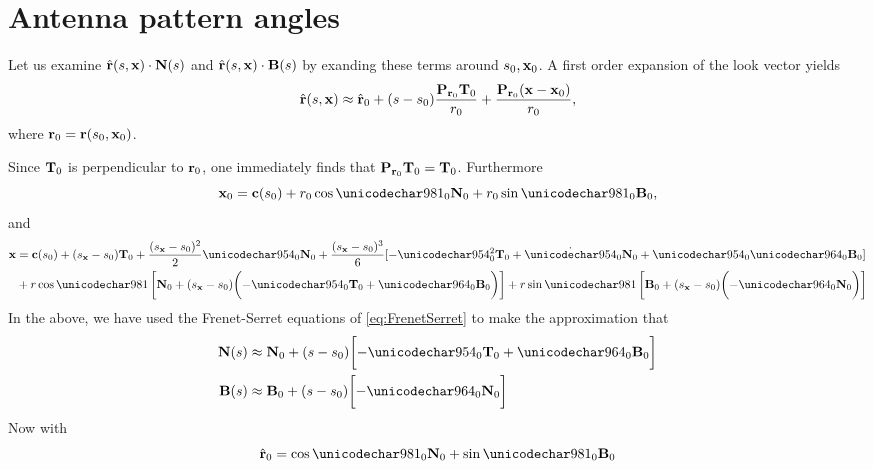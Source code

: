 \section{Antenna pattern angles}
\label{an:Angles}
Let us examine $\hat{\mathbf{r}}(s, \mathbf{\mathbf{x}})\cdot\mathbf{N}(s)$ and $\hat{\mathbf{r}}(s, \mathbf{\mathbf{x}})\cdot\mathbf{B}(s)$ by exanding these terms around $s_0, \mathbf{x}_0$. A first order expansion of the look vector yields
\begin{equation}
 \uRangeVectorParm \approx \uRangeVectorParmZero + (\parm-\parm_0)\frac{\mtx{P}_{\rangeVectorParmZero}\vct{T}_0}{\targetrangez} + \frac{\mtx{P}_{\rangeVectorParmZero}(\targetnoparm-\targetnoparmzero)}{\targetrangez},
\end{equation}
where $\mathbf{r}_0=\mathbf{r}(s_0, \mathbf{\mathbf{x}}_0)$.
\par
Since $\mathbf{T}_0$ is perpendicular to $\mathbf{r}_0$, one immediately finds that $\mtx{P}_{\rangeVectorParmZero}\vct{T}_0 = \vct{T}_0$. Furthermore
\begin{equation}
 \targetnoparmzero = \sat(\parm_0) + \targetrangez\cos\targetdepressionz\vct{N}_0 + \targetrangez\sin\targetdepressionz\vct{B}_0,
 \label{eq:pzero}
\end{equation}
and
\begin{equation}
\begin{split}
 \targetnoparm &= \sat(\parm_0) + (\targetxparm - \parm_0)\vct{T}_0 + \frac{(\targetxparm - \parm_0)^2}{2}\kappa_0\vct{N}_0 + \frac{(\targetxparm - \parm_0)^3}{6}[-\kappa^2_0\vct{T}_0 + \dot{\kappa}_0\vct{N}_0 + \kappa_0\tau_0\vct{B}_0]\\ 
 &+ \targetrange\cos\targetdepression\left[\vct{N}_0 + (\targetxparm - \parm_0)\biggl(-\kappa_0\vct{T}_0 + \tau_0\vct{B}_0\biggr)\right] + \targetrange\sin\targetdepression\left[\vct{B}_0 + (\targetxparm - \parm_0)\biggl(- \tau_0\vct{N}_0\biggr)\right]
 \label{eq:ptarget}
 \end{split}
\end{equation}
In the above, we have used the Frenet-Serret equations of \eqref{eq:FrenetSerret} to make the approximation that
\begin{align}
 \mtx{N}(\parm)&\approx\vct{N}_0 + (\parm - \parm_0)\biggl[-\kappa_0\vct{T}_0 + \tau_0\vct{B}_0\biggr]\\
 \mtx{B}(\parm)&\approx\vct{B}_0 + (\parm - \parm_0)\biggl[- \tau_0\vct{N}_0\biggr]
\end{align}
Now with
\begin{equation}
 \uRangeVectorParmZero = \cos\targetdepressionz\vct{N}_0 + \sin\targetdepressionz\vct{B}_0
\end{equation}
